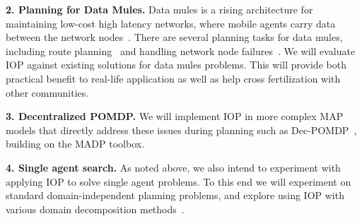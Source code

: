 \documentclass[11pt]{article}
\begin{document}
{\bf 2. Planning for Data Mules.} Data mules is a rising architecture for maintaining low-cost high latency networks, where mobile agents carry data between the network nodes~\cite{shah2003data}. %
There are several planning tasks for data mules, including route planning~\cite{sugihara2011path} and handling network node failures~\cite{crowcroft2016using}. We will evaluate IOP against existing solutions for data mules problems. This will provide both practical benefit to real-life application as well as help cross fertilization with other communities.



{\bf 3. Decentralized POMDP.} We will implement IOP in more complex MAP models that directly address these issues during planning such as Dec-POMDP~\cite{bernstein2002complexity}, building on the MADP toolbox.  %



{\bf 4. Single agent search.} As noted above, we also intend to experiment with applying IOP to solve single agent problems. To this end we will experiment on standard domain-independent planning problems, and explore  using IOP with various domain decomposition methods~\cite{nissim2012tunneling,amir2003factored}. 















\pagebreak
\small

%

\end{document}
